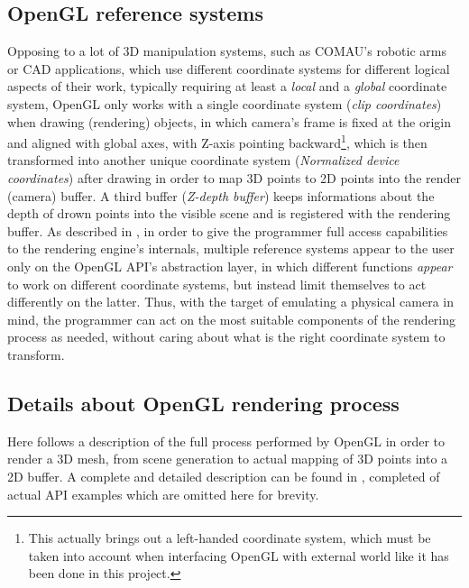 \subsection{OpenGL reference systems} \label{opengl-reference-systems}
Opposing to a lot of 3D manipulation systems, such as COMAU's robotic arms or
CAD applications, which use different coordinate systems for different logical
aspects of their work, typically requiring at least a \emph{local} and a
\emph{global} coordinate system, OpenGL only works with a single 
coordinate system (\emph{clip coordinates}) when drawing (rendering) objects,
in which camera's frame is fixed at the origin and aligned with global axes,
with Z-axis pointing backward\footnote{This actually brings out a left-handed
  coordinate system, which must be taken into account when interfacing OpenGL
with external world like it has been done in this project.},
which is then transformed into another unique coordinate system
(\emph{Normalized device coordinates}) after drawing in order to map 3D points to 2D points into the
render (camera) buffer. A third buffer (\emph{Z-depth buffer}) keeps
informations about the depth of drown points into the visible scene and is
registered with the rendering buffer. As described in \cite{opengl-book}, in order to give the
programmer full access capabilities to the rendering engine's internals, 
multiple reference systems appear to the user only on the
OpenGL API's abstraction layer, in which different functions \emph{appear} to
work on different coordinate systems, but instead limit themselves to act
differently on the latter. Thus, with the target of emulating a physical
camera in mind, the programmer can act on the most suitable components of the
rendering process as needed, without caring about what is the right coordinate
system to transform. 

\subsection{Details about OpenGL rendering process} \label{sec:opengl-rendering-process}
Here follows a description of the full process performed by OpenGL in order to
render a 3D mesh, from scene generation to actual mapping of 3D points into a
2D buffer. A complete and detailed description can be found in
\cite{opengl-book}, completed of actual API examples which are omitted here
for brevity.

